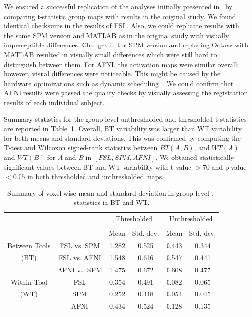 \documentclass[conference]{IEEEtran}
\begin{document}
We ensured a successful replication of the analyses initially presented in~\cite{bowring2019exploring}
by comparing t-statistic group maps with results in the original study.
We found identical checksums in the results of FSL.
Also, we could replicate results with the same SPM version and MATLAB as in the original study with visually imperceptible differences.
Changes in the SPM version and replacing Octave with MATLAB resulted in visually small differences which were still hard to distinguish between them.
For AFNI, the activation maps were similar overall; however, visual differences were noticeable.
This might be caused by the hardware optimizations such as dynamic scheduling~\cite{demmel2013numerical}.
We could confirm that AFNI results were passed the quality checks by visually assessing the registration results of each individual subject.

Summary statistics for the group-level unthresholded and thresholded t-statistics are reported in Table~\ref{table:pipeline-stats}.
Overall, BT variability was larger than WT variability for both means and standard deviations.
This was confirmed by computing the T-test and Wilcoxon signed-rank statistics between $BT(A, B)$, and $WT(A)$ and $WT(B)$ for $A$ and $B$ in $[FSL, SPM, AFNI]$.
We obtained statistically significant values between BT and WT variability with t-value $> 70$ and p-value $< 0.05$ in both thresholded and unthresholded maps.

\setlength{\tabcolsep}{5pt}
\begin{table}[h]
    \centering
    \begin{tabular}{cccc|cc}
        \toprule
        \multirow{2}{*}{}& {} & \multicolumn{2}{c}{Thresholded} & \multicolumn{2}{c}{Unthresholded} \\
        \cmidrule{3-4} \cmidrule{5-6} \\
        {} & {} & Mean & Std. dev. & Mean & Std. dev. \\
        \midrule
        \rowcolor{lightgray}
        {Between Tools} & FSL vs. SPM        &  1.282       & 0.525      & 0.443     & 0.344  \\
        \rowcolor{lightgray}
        {(BT)} & FSL vs. AFNI                &  1.548       & 0.616      & 0.547     & 0.441  \\
        \rowcolor{lightgray}
        {} & AFNI vs. SPM                    &  1.475       & 0.672      & 0.608     & 0.477  \\
        {Within Tool} & FSL                  &  0.354       & 0.491      & 0.082     & 0.065  \\
        {(WT)}   & SPM                       &  0.252       & 0.448      & 0.054     & 0.045  \\
        {}   & AFNI                          &  0.434       & 0.524      & 0.128     & 0.135  \\
        \bottomrule
    \end{tabular}
    \caption{Summary of voxel-wise mean and standard deviation in group-level t-statistics in BT and WT.}
    \label{table:pipeline-stats}
\end{table}
\end{document}
